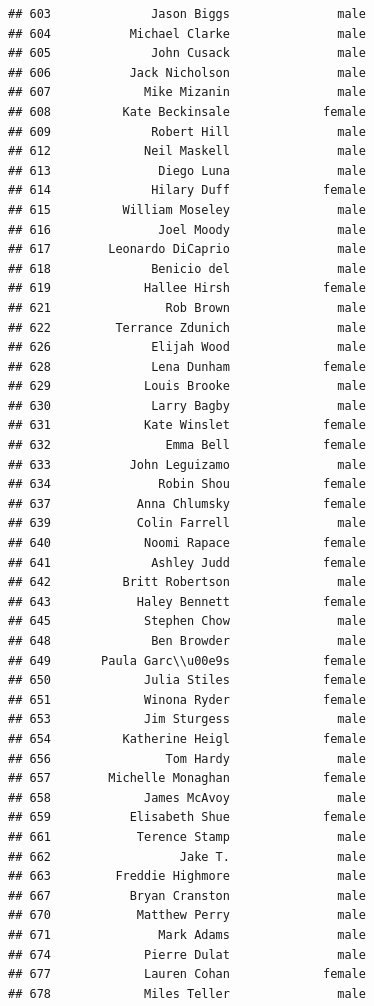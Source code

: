 \documentclass[
]{article}
\begin{document}
\begin{verbatim}
## 603              Jason Biggs               male
## 604           Michael Clarke               male
## 605              John Cusack               male
## 606           Jack Nicholson               male
## 607             Mike Mizanin               male
## 608          Kate Beckinsale             female
## 609              Robert Hill               male
## 612             Neil Maskell               male
## 613               Diego Luna               male
## 614              Hilary Duff             female
## 615          William Moseley               male
## 616               Joel Moody               male
## 617        Leonardo DiCaprio               male
## 618              Benicio del               male
## 619             Hallee Hirsh             female
## 621                Rob Brown               male
## 622         Terrance Zdunich               male
## 626              Elijah Wood               male
## 628              Lena Dunham             female
## 629             Louis Brooke               male
## 630              Larry Bagby               male
## 631             Kate Winslet             female
## 632                Emma Bell             female
## 633           John Leguizamo               male
## 634               Robin Shou             female
## 637            Anna Chlumsky             female
## 639            Colin Farrell               male
## 640             Noomi Rapace             female
## 641              Ashley Judd             female
## 642          Britt Robertson               male
## 643            Haley Bennett             female
## 645             Stephen Chow               male
## 648              Ben Browder               male
## 649       Paula Garc\\u00e9s             female
## 650             Julia Stiles             female
## 651             Winona Ryder             female
## 653             Jim Sturgess               male
## 654          Katherine Heigl             female
## 656                Tom Hardy               male
## 657        Michelle Monaghan             female
## 658             James McAvoy               male
## 659           Elisabeth Shue             female
## 661            Terence Stamp               male
## 662                  Jake T.               male
## 663         Freddie Highmore               male
## 667           Bryan Cranston               male
## 670            Matthew Perry               male
## 671               Mark Adams               male
## 674             Pierre Dulat               male
## 677             Lauren Cohan             female
## 678             Miles Teller               male

\end{verbatim}
\end{document}
